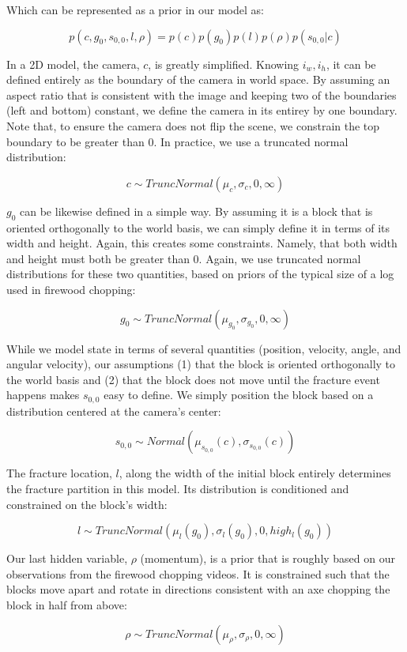 \documentclass[runningheads]{llncs}
\begin{document}
Which can be represented as a prior in our model as:

$$
p(c, g_0, s_{0,0}, l, \rho) = p(c)p(g_0)p(l)p(\rho)p(s_{0,0}|c)
$$

In a 2D model, the camera, $c$, is greatly simplified. Knowing $i_w, i_h$, it can 
be defined entirely as the boundary of the camera in world space. By assuming 
an aspect ratio that is consistent with the image and keeping two of the 
boundaries (left and bottom) constant, we define the camera in its entirey by 
one boundary. Note that, to ensure the camera does not flip the scene, we 
constrain the top boundary to be greater than 0. In practice, we use a truncated 
normal distribution:

$$
c \sim TruncNormal(\mu_c, \sigma_c, 0, \infty)
$$

$g_0$ can be likewise defined in a simple way. By assuming it is a block that is 
oriented orthogonally to the world basis, we can simply define it in terms of 
its width and height. Again, this creates some constraints. Namely, that both 
width and height must both be greater than 0. Again, we use truncated normal 
distributions for these two quantities, based on priors of the typical size 
of a log used in firewood chopping:

$$
g_0 \sim TruncNormal(\mu_{g_0}, \sigma_{g_0}, 0, \infty)
$$

While we model state in terms of several quantities (position, velocity, angle, 
and angular velocity), our assumptions (1) that the block is oriented 
orthogonally to the world basis and (2) that the block does not move until the 
fracture event happens makes $s_{0,0}$ easy to define. We simply position the 
block based on a distribution centered at the camera's center:

$$
s_{0,0} \sim Normal(\mu_{s_{0,0}}(c), \sigma_{s_{0,0}}(c))
$$

The fracture location, $l$, along the width of the initial block entirely determines 
the fracture partition in this model. Its distribution is conditioned and 
constrained on the block's width:

$$
l \sim TruncNormal(\mu_{l}(g_0), \sigma_{l}(g_0), 0, high_{l}(g_0))
$$

Our last hidden variable, $\rho$ (momentum), is a prior that is roughly based on our 
observations from the firewood chopping videos. It is constrained such that 
the blocks move apart and rotate in directions consistent with an axe chopping 
the block in half from above:

$$
\rho \sim TruncNormal(\mu_{\rho}, \sigma_{\rho}, 0, \infty)
$$
\end{document}
